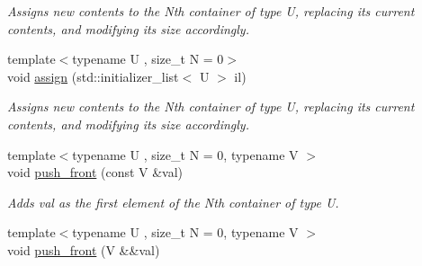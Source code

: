 \begin{DoxyCompactItemize}
\begin{DoxyCompactList}\small\item\em Assigns new contents to the Nth container of type U, replacing its current contents, and modifying its size accordingly. \end{DoxyCompactList}\item 
\hypertarget{classheterogeneous_1_1heteroforward__list_3_01_t_00_01_types_8_8_8_4_ad1ed801628cdbf5ca2accad78dcc9d3d}{}{\footnotesize template$<$typename U , size\+\_\+t N = 0$>$ }\\void \hyperlink{classheterogeneous_1_1heteroforward__list_3_01_t_00_01_types_8_8_8_4_ad1ed801628cdbf5ca2accad78dcc9d3d}{assign} (std\+::initializer\+\_\+list$<$ U $>$ il)\label{classheterogeneous_1_1heteroforward__list_3_01_t_00_01_types_8_8_8_4_ad1ed801628cdbf5ca2accad78dcc9d3d}

\begin{DoxyCompactList}\small\item\em Assigns new contents to the Nth container of type U, replacing its current contents, and modifying its size accordingly. \end{DoxyCompactList}\item 
\hypertarget{classheterogeneous_1_1heteroforward__list_3_01_t_00_01_types_8_8_8_4_a952b61e4e967a2edede3f9320060f580}{}{\footnotesize template$<$typename U , size\+\_\+t N = 0, typename V $>$ }\\void \hyperlink{classheterogeneous_1_1heteroforward__list_3_01_t_00_01_types_8_8_8_4_a952b61e4e967a2edede3f9320060f580}{push\+\_\+front} (const V \&val)\label{classheterogeneous_1_1heteroforward__list_3_01_t_00_01_types_8_8_8_4_a952b61e4e967a2edede3f9320060f580}

\begin{DoxyCompactList}\small\item\em Adds val as the first element of the Nth container of type U. \end{DoxyCompactList}\item 
\hypertarget{classheterogeneous_1_1heteroforward__list_3_01_t_00_01_types_8_8_8_4_a81dde168151ea21d05ad2965d4346967}{}{\footnotesize template$<$typename U , size\+\_\+t N = 0, typename V $>$ }\\void \hyperlink{classheterogeneous_1_1heteroforward__list_3_01_t_00_01_types_8_8_8_4_a81dde168151ea21d05ad2965d4346967}{push\+\_\+front} (V \&\&val)\label{classheterogeneous_1_1heteroforward__list_3_01_t_00_01_types_8_8_8_4_a81dde168151ea21d05ad2965d4346967}


\end{DoxyCompactItemize}
